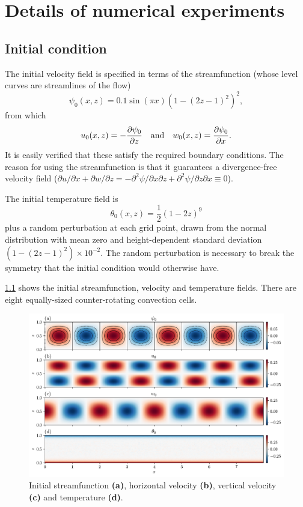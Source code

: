 \documentclass[../main.tex]{subfiles}
\begin{document}
\chapter{Details of numerical experiments} \label{chap:details}
\section{Initial condition} \label{sec:initial_condition}
The initial velocity field is specified in terms of the streamfunction
(whose level curves are streamlines of the flow)
\[
    \psi_0(x, z) = 0.1 \sin(\pi x) (1 - (2z - 1)^2)^2,
\]
from which
\[
    u_0(x, z) = -\frac{\partial \psi_0}{\partial z}
    \quad \text{and} \quad
    w_0(x, z) = \frac{\partial \psi_0}{\partial x}.
\]
It is easily verified that these satisfy the required boundary conditions. The
reason for using the streamfunction is that it guarantees a divergence-free
velocity field ($\partial u /\partial x + \partial w /\partial z = -\partial^2
\psi/\partial x \partial z + \partial^2 \psi/\partial z \partial x \equiv 0$).

The initial temperature field is
\[
    \theta_0(x, z) = \frac{1}{2} (1 - 2z)^9
\]
plus a random perturbation at each grid point, drawn from the normal
distribution with mean zero and height-dependent standard deviation
$(1 - (2z - 1)^2) \times 10^{-2}$. The random perturbation is necessary to
break the symmetry that the initial condition would otherwise have.

\cref{fig:init} shows the initial streamfunction, velocity and temperature
fields. There are eight equally-sized counter-rotating convection cells.

\begin{figure}[ht]
    \centering
    \includegraphics[width=\linewidth]{figures/init.pdf}
    \caption{
        Initial streamfunction \textbf{(a)}, horizontal velocity \textbf{(b)},
        vertical velocity \textbf{(c)} and temperature \textbf{(d)}.
    }
    \label{fig:init}
\end{figure}
\end{document}
